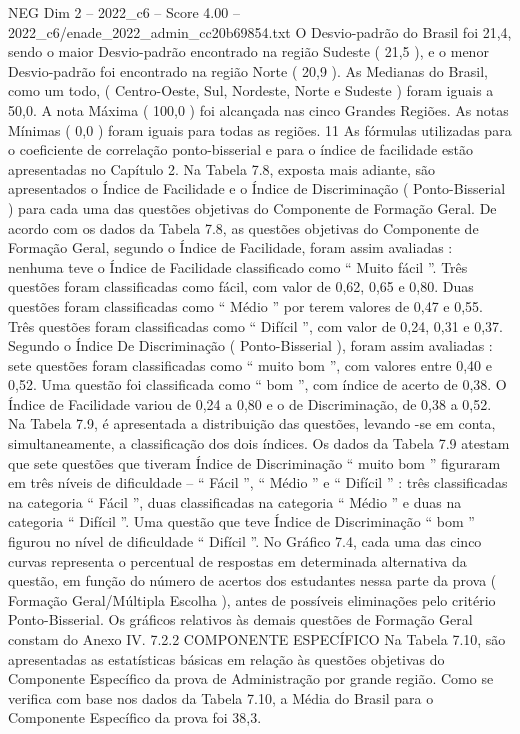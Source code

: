 \begin{textsample}{NEG Dim 2 – 2022\_c6 – Score 4.00 – 2022\_c6/enade\_2022\_admin\_cc20b69854.txt}
O Desvio-padrão do Brasil foi 21,4, sendo o maior Desvio-padrão encontrado na região Sudeste ( 21,5 ), e o menor Desvio-padrão foi encontrado na região Norte ( 20,9 ).
As Medianas do Brasil, como um todo, ( Centro-Oeste, Sul, Nordeste, Norte e Sudeste ) foram iguais a 50,0.
A nota Máxima ( 100,0 ) foi alcançada nas cinco Grandes Regiões.
As notas Mínimas ( 0,0 ) foram iguais para todas as regiões. 11 As fórmulas utilizadas para o coeficiente de correlação ponto-bisserial e para o índice de facilidade estão apresentadas no Capítulo 2.
Na Tabela 7.8, exposta mais adiante, são apresentados o Índice de Facilidade e o Índice de Discriminação ( Ponto-Bisserial ) para cada uma das questões objetivas do Componente de Formação Geral.
De acordo com os dados da Tabela 7.8, as questões objetivas do Componente de Formação Geral, segundo o Índice de Facilidade, foram assim avaliadas : nenhuma teve o Índice de Facilidade classificado como “ Muito fácil ”.
Três questões foram classificadas como fácil, com valor de 0,62, 0,65 e 0,80.
Duas questões foram classificadas como “ Médio ” por terem valores de 0,47 e 0,55.
Três questões foram classificadas como “ Difícil ”, com valor de 0,24, 0,31 e 0,37.
Segundo o Índice De Discriminação ( Ponto-Bisserial ), foram assim avaliadas : sete questões foram classificadas como “ muito bom ”, com valores entre 0,40 e 0,52.
Uma questão foi classificada como “ bom ”, com índice de acerto de 0,38.
O Índice de Facilidade variou de 0,24 a 0,80 e o de Discriminação, de 0,38 a 0,52.
Na Tabela 7.9, é apresentada a distribuição das questões, levando -se em conta, simultaneamente, a classificação dos dois índices.
Os dados da Tabela 7.9 atestam que sete questões que tiveram Índice de Discriminação “ muito bom ” figuraram em três níveis de dificuldade – “ Fácil ”, “ Médio ” e “ Difícil ” : três classificadas na categoria “ Fácil ”, duas classificadas na categoria “ Médio ” e duas na categoria “ Difícil ”.
Uma questão que teve Índice de Discriminação “ bom ” figurou no nível de dificuldade “ Difícil ”.
No Gráfico 7.4, cada uma das cinco curvas representa o percentual de respostas em determinada alternativa da questão, em função do número de acertos dos estudantes nessa parte da prova ( Formação Geral/Múltipla Escolha ), antes de possíveis eliminações pelo critério Ponto-Bisserial.
Os gráficos relativos às demais questões de Formação Geral constam do Anexo IV. 7.2.2 COMPONENTE ESPECÍFICO Na Tabela 7.10, são apresentadas as estatísticas básicas em relação às questões objetivas do Componente Específico da prova de Administração por grande região.
Como se verifica com base nos dados da Tabela 7.10, a Média do Brasil para o Componente Específico da prova foi 38,3.

\end{textsample}
